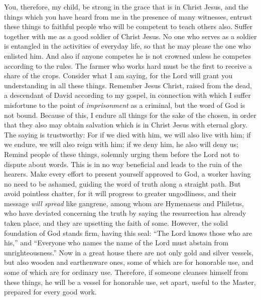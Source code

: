 \begin{biblechapter} %
 You, therefore, my child, be strong in the grace that is in Christ Jesus,
\verse and the things which you have heard from me in the presence of many witnesses, entrust these things to faithful people who will be competent to teach others also.
\verse Suffer together with me as a good soldier of Christ Jesus.
\verse No one who serves as a soldier is entangled in the activities of everyday life, so that he may please the one who enlisted him.
\verse And also if anyone competes he is not crowned unless he competes according to the rules.
\verse The farmer who works hard must be the first to receive a share of the crops.
\verse Consider what I am saying, for the Lord will grant you understanding in all these things.
 Remember Jesus Christ, raised from the dead, a descendant of David according to my gospel,
\verse in connection with which I suffer misfortune to the point of \textit{imprisonment} as a criminal, but the word of God is not bound.
\verse Because of this, I endure all things for the sake of the chosen, in order that they also may obtain salvation which is in Christ Jesus with eternal glory.
\verse The saying is trustworthy:
\verse For if we died with him, we will also live with him;
\verse if we endure, we will also reign with him; 
if we deny him, he also will deny us;
 Remind people of these things, solemnly urging them before the Lord not to dispute about words. This is in no way beneficial and leads to the ruin of the hearers.
\verse Make every effort to present yourself approved to God, a worker having no need to be ashamed, guiding the word of truth along a straight path.
\verse But avoid pointless chatter, for it will progress to greater ungodliness,
\verse and their message \textit{will spread} like gangrene, among whom are Hymenaeus and Philetus,
\verse who have deviated concerning the truth by saying the resurrection has already taken place, and they are upsetting the faith of some.
\verse However, the solid foundation of God stands firm, having this seal: “The Lord knows those who are his,” and “Everyone who names the name of the Lord must abstain from unrighteousness.”
\verse Now in a great house there are not only gold and silver vessels, but also wooden and earthenware ones, some of which are for honorable use, and some of which are for ordinary use.
\verse Therefore, if someone cleanses himself from these things, he will be a vessel for honorable use, set apart, useful to the Master, prepared for every good work.

\end{biblechapter}
